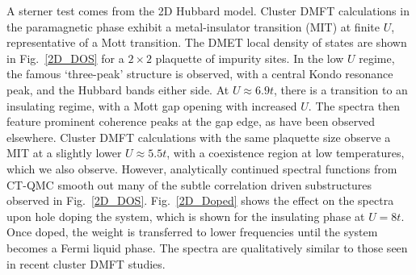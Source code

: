 \documentclass[aps,twocolumn,nobibnotes]{revtex4}
\begin{document}
A sterner test comes from the 2D Hubbard model. Cluster DMFT calculations in the paramagnetic phase exhibit a metal-insulator transition (MIT)
at finite $U$, representative of a Mott transition\cite{Georges1996,Senechal2000,Kotliar2008,Millis2012,Millis2013,Zgid2012}.
The DMET local density of
states are shown in Fig.~\ref{2D_DOS} for a $2 \times 2$ plaquette of impurity sites. In the low $U$ regime, the famous `three-peak' structure 
is observed, with a central Kondo resonance peak, and the Hubbard bands either side. At $U \approx 6.9t$, there is a transition to an insulating 
regime, with a Mott gap opening with increased $U$. The spectra then feature prominent coherence peaks at the gap edge, as have been observed 
elsewhere\cite{Kotliar2008}. Cluster DMFT calculations with the same plaquette size observe a MIT at a slightly lower $U\approx5.5t$, 
with a coexistence region at low temperatures, which we also observe. However, analytically continued
spectral functions from CT-QMC smooth out many of the subtle correlation driven substructures observed in Fig.~\ref{2D_DOS}. 
Fig.~\ref{2D_Doped} shows the effect on the 
spectra upon hole doping the system, which is shown for the insulating phase at $U=8t$. Once doped, the weight is transferred to lower frequencies
until the system becomes a Fermi liquid phase. The spectra are qualitatively similar to those seen in recent cluster DMFT studies\cite{Masatoshi2009}.
\end{document}
